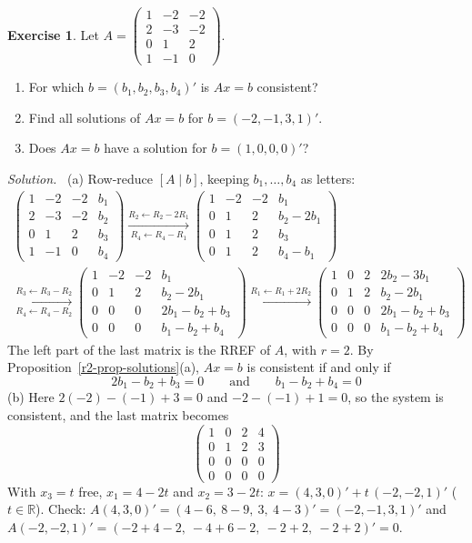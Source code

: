 \documentclass[12pt]{article}
\newcommand{\R}{\mathbb R}
\theoremstyle{definition}
\newtheorem{exercise}{Exercise}
\newenvironment{solution}{\par\noindent\textit{Solution.}\ }{\par\smallskip}
\begin{document}
\begin{exercise}\label{r2-dr-consistency}
Let \(A=\begin{pmatrix}1&-2&-2\\2&-3&-2\\0&1&2\\1&-1&0\end{pmatrix}\).
\begin{enumerate}
\item For which \(b=(b_1,b_2,b_3,b_4)'\) is \(Ax=b\) consistent?
\item Find all solutions of \(Ax=b\) for \(b=(-2,-1,3,1)'\).
\item Does \(Ax=b\) have a solution for \(b=(1,0,0,0)'\)?
\end{enumerate}
\end{exercise}
\begin{solution}
(a) Row-reduce \([A\mid b]\), keeping \(b_1,\dots,b_4\) as letters:
\[
\begin{gathered}
\left(\begin{array}{ccc|c}1&-2&-2&b_1\\2&-3&-2&b_2\\0&1&2&b_3\\1&-1&0&b_4\end{array}\right)
\xrightarrow[R_4\leftarrow R_4-R_1]{R_2\leftarrow R_2-2R_1}
\left(\begin{array}{ccc|c}1&-2&-2&b_1\\0&1&2&b_2-2b_1\\0&1&2&b_3\\0&1&2&b_4-b_1\end{array}\right)
\\
\xrightarrow[R_4\leftarrow R_4-R_2]{R_3\leftarrow R_3-R_2}
\left(\begin{array}{ccc|c}1&-2&-2&b_1\\0&1&2&b_2-2b_1\\0&0&0&2b_1-b_2+b_3\\0&0&0&b_1-b_2+b_4\end{array}\right)
\xrightarrow{R_1\leftarrow R_1+2R_2}
\left(\begin{array}{ccc|c}1&0&2&2b_2-3b_1\\0&1&2&b_2-2b_1\\0&0&0&2b_1-b_2+b_3\\0&0&0&b_1-b_2+b_4\end{array}\right)
\end{gathered}
\]
The left part of the last matrix is the RREF of \(A\), with \(r=2\). By Proposition~\ref{r2-prop-solutions}(a),
\(Ax=b\) is consistent if and only if
\[
2b_1-b_2+b_3=0\qquad\text{and}\qquad b_1-b_2+b_4=0
\]
(b) Here \(2(-2)-(-1)+3=0\) and \(-2-(-1)+1=0\), so the system is consistent, and the last matrix becomes
\[
\left(\begin{array}{ccc|c}1&0&2&4\\0&1&2&3\\0&0&0&0\\0&0&0&0\end{array}\right)
\]
With \(x_3=t\) free, \(x_1=4-2t\) and \(x_2=3-2t\):
\(x=(4,3,0)'+t\,(-2,-2,1)'\) (\(t\in\R\)). Check: \(A(4,3,0)'=(4-6,\ 8-9,\ 3,\ 4-3)'=(-2,-1,3,1)'\) and
\(A(-2,-2,1)'=(-2+4-2,\ -4+6-2,\ -2+2,\ -2+2)'=0\).


\end{solution}
\end{document}
